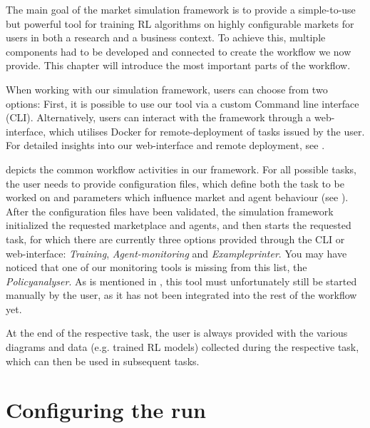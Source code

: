 \begin{jointwork}\label{ch:OurWorkflow}
	The main goal of the market simulation framework is to provide a simple-to-use but powerful tool for training RL algorithms on highly configurable markets for users in both a research and a business context. To achieve this, multiple components had to be developed and connected to create the workflow we now provide. This chapter will introduce the most important parts of the workflow.
\end{jointwork}

When working with our simulation framework, users can choose from two options: First, it is possible to use our tool via a custom Command line interface (CLI). Alternatively, users can interact with the framework through a web-interface, which utilises Docker for remote-deployment of tasks issued by the user. For detailed insights into our web-interface and remote deployment, see \cite{JudithThesis}.

 depicts the common workflow activities in our framework. For all possible tasks, the user needs to provide configuration files, which define both the task to be worked on and parameters which influence market and agent behaviour (see ). After the configuration files have been validated, the simulation framework initialized the requested marketplace and agents, and then starts the requested task, for which there are currently three options provided through the CLI or web-interface: \emph{Training}, \emph{Agent-monitoring} and \emph{Exampleprinter}. You may have noticed that one of our monitoring tools is missing from this list, the \emph{Policyanalyser}. As is mentioned in , this tool must unfortunately still be started manually by the user, as it has not been integrated into the rest of the workflow yet.

At the end of the respective task, the user is always provided with the various diagrams and data (e.g. trained RL models) collected during the respective task, which can then be used in subsequent tasks.

\section{Configuring the run}\label{sec:ConfigureRun}

